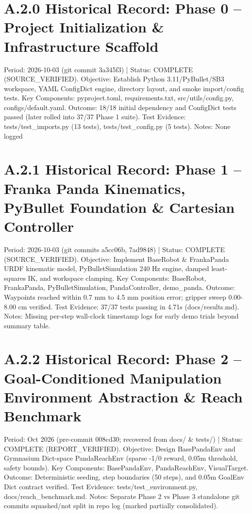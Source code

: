 \documentclass[11pt,a4paper,oneside]{book}
\begin{document}
\section{A.2.0 Historical Record: Phase 0 -- Project Initialization \& Infrastructure Scaffold}
Period: 2026-10-03 (git commit 3a345f3) | Status: COMPLETE (SOURCE\_VERIFIED). Objective: Establish Python 3.11/PyBullet/SB3 workspace, YAML ConfigDict engine, directory layout, and smoke import/config tests. Key Components: pyproject.toml, requirements.txt, src/utils/config.py, configs/default.yaml. Outcome: 18/18 initial dependency and ConfigDict tests passed (later rolled into 37/37 Phase 1 suite). Test Evidence: tests/test\_imports.py (13 tests), tests/test\_config.py (5 tests). Notes: None logged

\section{A.2.1 Historical Record: Phase 1 -- Franka Panda Kinematics, PyBullet Foundation \& Cartesian Controller}
Period: 2026-10-03 (git commits a5cc06b, 7ad9848) | Status: COMPLETE (SOURCE\_VERIFIED). Objective: Implement BaseRobot \& FrankaPanda URDF kinematic model, PyBulletSimulation 240 Hz engine, damped least-squares IK, and workspace clamping. Key Components: BaseRobot, FrankaPanda, PyBulletSimulation, PandaController, demo\_panda. Outcome: Waypoints reached within 0.7 mm to 4.5 mm position error; gripper sweep 0.00-8.00 cm verified. Test Evidence: 37/37 tests passing in 4.71s (docs/results.md). Notes: Missing per-step wall-clock timestamp logs for early demo trials beyond summary table.

\section{A.2.2 Historical Record: Phase 2 -- Goal-Conditioned Manipulation Environment Abstraction \& Reach Benchmark}
Period: Oct 2026 (pre-commit 008cd30; recovered from docs/ \& tests/) | Status: COMPLETE (REPORT\_VERIFIED). Objective: Design BasePandaEnv and Gymnasium Dict-space PandaReachEnv (sparse -1/0 reward, 0.05m threshold, safety bounds). Key Components: BasePandaEnv, PandaReachEnv, VisualTarget. Outcome: Deterministic seeding, step boundaries (50 steps), and 0.05m GoalEnv Dict contract verified. Test Evidence: tests/test\_environment.py, docs/reach\_benchmark.md. Notes: Separate Phase 2 vs Phase 3 standalone git commits squashed/not split in repo log (marked partially consolidated).
\end{document}
